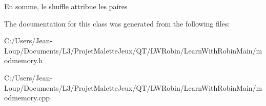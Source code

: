En somme, le shuffle attribue les paires 

The documentation for this class was generated from the following files\+:\begin{DoxyCompactItemize}
\item 
C\+:/\+Users/\+Jean-\/\+Loup/\+Documents/\+L3/\+Projet\+Malette\+Jeux/\+Q\+T/\+L\+W\+Robin/\+Learn\+With\+Robin\+Main/modmemory.\+h\item 
C\+:/\+Users/\+Jean-\/\+Loup/\+Documents/\+L3/\+Projet\+Malette\+Jeux/\+Q\+T/\+L\+W\+Robin/\+Learn\+With\+Robin\+Main/modmemory.\+cpp\end{DoxyCompactItemize}
